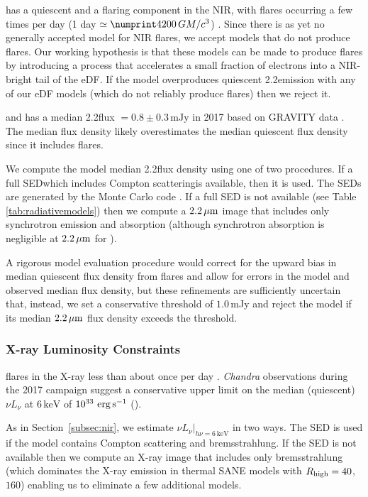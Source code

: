 \sgra has a quiescent and a flaring component in the NIR, with flares occurring a few times per day
(1 day $\simeq \no{4200}\,\tg$) \citep{2018ApJ...863...15W}.
Since there is as yet no generally accepted model for NIR flares, we accept models that do not produce flares.
Our working hypothesis is that these models can be made to produce flares by introducing a process that accelerates a small fraction of electrons into a  NIR-bright tail of the eDF.
If the model overproduces quiescent 2.2\um emission with any of our eDF models (which do not reliably produce flares) then we reject it.

\sgra and has a median 2.2\um flux $= 0.8 \pm 0.3\,\mathrm{mJy}$ in 2017 based on GRAVITY data \citep[][see Table 1]{2020A&A...638A...2G}.
The median flux density likely overestimates the median quiescent flux density since it includes flares.

We compute the model median 2.2\um flux density using one of two procedures.
If a full SED\textemdash which includes Compton scattering\textemdash is available, then it is used.
The SEDs are generated by the \grmonty Monte Carlo code \citep{2009ApJS..184..387D, Wong_2022}.
If a full SED is not available (see Table \ref{tab:radiativemodels}) then we compute a $2.2\,\mu\mathrm{m}$ image that includes only synchrotron emission and absorption (although synchrotron absorption is negligible at $2.2\,\mu\mathrm{m}$ for \sgra).

A rigorous model evaluation procedure would correct for the upward bias in median quiescent flux density from flares and allow for errors in the model and observed median flux density, but these refinements are sufficiently uncertain that, instead, we set a conservative threshold of $1.0$\,mJy and reject the model if its
median $2.2\,\mu\mathrm{m}$ flux density exceeds the threshold.

\subsubsection{X-ray Luminosity Constraints}

\sgra flares in the X-ray less than about once per day \citep[see][and references therein]{2018MNRAS.473..306Y}.
\emph{Chandra} observations during the 2017 campaign suggest a conservative upper limit on the median (quiescent) $\nu L_\nu$ at $6\,\mathrm{keV}$ of $10^{33}\,\,\mathrm{erg}\,\mathrm{s}^{-1}$ ().

As in Section~\ref{subsec:nir}, we estimate $\left.\nu L_\nu\right|_{h\nu=6\,\mathrm{keV}}$ in two ways.
The SED is used if the model contains Compton scattering and bremsstrahlung.
If the SED is not available then we compute an X-ray image that includes only bremsstrahlung (which dominates the X-ray emission in thermal SANE models with $R_\mathrm{high} = 40$, $160$) enabling us to eliminate a few additional models.

